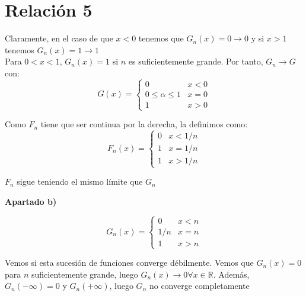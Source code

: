 \documentclass[openany]{book}
\begin{document}
\chapter{Relación 5}


\begin{exercise}
    
    $  $\\ 
    Claramente, en el caso de que $ x< 0 $ tenemos que $ G_n(x) = 0 \to 0 $ y si $ x >  1 $ tenemos $ G_n(x)=1 \to 1$\\ 

    Para $ 0<x<1 $, $ G_n(x) = 1 $ si $ n $ es suficientemente grande. Por tanto, $ G_n \to G $ con:
    $$ G(x) = \left\{
        \begin{array}{ll}
    0 & x < 0 \\ 
    0 \leq  \alpha \leq  1 & x = 0\\ 
    1 & x > 0
\end{array}
    \right. $$

    Como $ F_n $ tiene que ser continua por la derecha, la definimos como:
    $$ F_n(x) = \left\{
    \begin{array}{ll}
    0 & x < 1/n \\ 
    1 & x = 1/n \\ 
    1 & x > 1/n
    \end{array}
    \right. $$

    $ F_n $ sigue teniendo el mismo límite que $ G_n $


    \begin{flushright}
    \textbf{Apartado b)}
    \end{flushright}

    $$ G_n(x) = \left\{
    \begin{array}{ll}
    0 & x < n\\ 
    1/n & x = n \\ 
     1 & x > n
    \end{array}
    \right. $$

    Vemos si esta sucesión de funciones converge débilmente. Vemos que $ G_n(x) = 0 $ para $ n  $ suficientemente grande, luego $ G_n(x) \to 0 \forall x \in \mathbb{R}$. Además, $ G_n(-\infty) = 0 $ y $ G_n(+\infty) $, luego $ G_n $ no converge completamente
        
\end{exercise}
    
\end{document}
